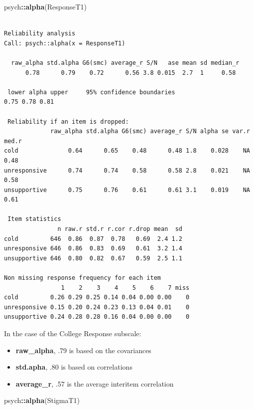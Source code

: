 \documentclass[
  english,
]{book}
\newenvironment{Shaded}{\begin{snugshade}}{\end{snugshade}}
\newcommand{\KeywordTok}[1]{\textcolor[rgb]{0.13,0.29,0.53}{\textbf{#1}}}
\newcommand{\NormalTok}[1]{#1}
\newcommand{\OperatorTok}[1]{\textcolor[rgb]{0.81,0.36,0.00}{\textbf{#1}}}
\providecommand{\tightlist}{%
  \setlength{\itemsep}{0pt}\setlength{\parskip}{0pt}}
\begin{document}
\begin{Shaded}
\begin{Highlighting}[]
\NormalTok{psych}\OperatorTok{::}\KeywordTok{alpha}\NormalTok{(ResponseT1)}
\end{Highlighting}
\end{Shaded}

\begin{verbatim}

Reliability analysis   
Call: psych::alpha(x = ResponseT1)

  raw_alpha std.alpha G6(smc) average_r S/N   ase mean sd median_r
      0.78      0.79    0.72      0.56 3.8 0.015  2.7  1     0.58

 lower alpha upper     95% confidence boundaries
0.75 0.78 0.81 

 Reliability if an item is dropped:
             raw_alpha std.alpha G6(smc) average_r S/N alpha se var.r med.r
cold              0.64      0.65    0.48      0.48 1.8    0.028    NA  0.48
unresponsive      0.74      0.74    0.58      0.58 2.8    0.021    NA  0.58
unsupportive      0.75      0.76    0.61      0.61 3.1    0.019    NA  0.61

 Item statistics 
               n raw.r std.r r.cor r.drop mean  sd
cold         646  0.86  0.87  0.78   0.69  2.4 1.2
unresponsive 646  0.86  0.83  0.69   0.61  3.2 1.4
unsupportive 646  0.80  0.82  0.67   0.59  2.5 1.1

Non missing response frequency for each item
                1    2    3    4    5    6    7 miss
cold         0.26 0.29 0.25 0.14 0.04 0.00 0.00    0
unresponsive 0.15 0.20 0.24 0.23 0.13 0.04 0.01    0
unsupportive 0.24 0.28 0.28 0.16 0.04 0.00 0.00    0
\end{verbatim}

In the case of the College Response subscale:

\begin{itemize}
\tightlist
\item
  \textbf{raw\_alpha}, .79 is based on the covariances
\item
  \textbf{std.apha}, .80 is based on correlations
\item
  \textbf{average\_r}, .57 is the average interitem correlation
\end{itemize}

\begin{Shaded}
\begin{Highlighting}[]
\NormalTok{psych}\OperatorTok{::}\KeywordTok{alpha}\NormalTok{(StigmaT1)}
\end{Highlighting}
\end{Shaded}
\end{document}
